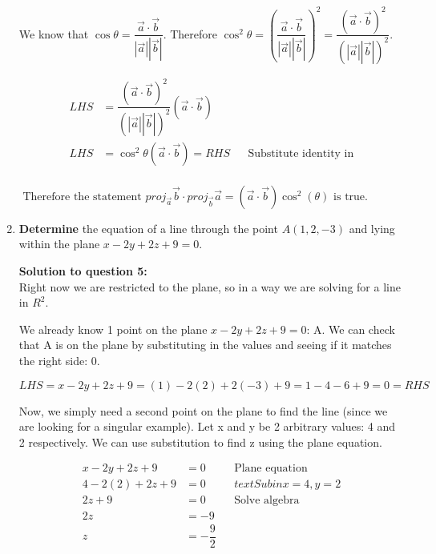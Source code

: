 \documentclass[12pt]{book}
\begin{document}
\begin{enumerate}
\vspace{-1cm}
We know that $\cos \theta = \dfrac{\vec{a} \cdot \vec{b}}{|\vec{a}||\vec{b}|}$. Therefore $\cos^2 \theta = \left(\dfrac{\vec{a} \cdot \vec{b}}{|\vec{a}||\vec{b}|} \right)^2 = \dfrac{(\vec{a} \cdot \vec{b})^2}{(|\vec{a}||\vec{b}|)^2}.$

\addtolength{\jot}{1em}
\begin{align*}
  LHS &= \dfrac{(\vec{a} \cdot \vec{b})^2}{(|\vec{a}||\vec{b}|)^2}(\vec{a} \cdot \vec{b}) \\
  LHS &= \cos^2 \theta(\vec{a} \cdot \vec{b}) = RHS && \text{Substitute identity in}\\
\end{align*}
  
\vspace{-2cm}
\begin{center}
  $\boxed{ \text{ Therefore the statement } proj_{\vec{a}}\vec{b} \cdot proj_{\vec{b}}\vec{a} = (\vec{a} \cdot \vec{b}) \cos^2(\theta) \text{ is true. }}$
\end{center}

\newpage

\item \textbf{Determine} the equation of a line through the point $A(1,2,-3)$ and lying within the plane $x-2y+2z+9=0$.

\vspace{0.3cm} 
\textbf{Solution to question 5:}\\
Right now we are restricted to the plane, so in a way we are solving for a line in $R^2$.

We already know 1 point on the plane $x-2y+2z+9=0$: A. We can check that A is on 
the plane by substituting in the values and seeing if it matches the right side: 0.

$$LHS = x-2y+2z+9 = (1)-2(2)+2(-3)+9 = 1 - 4 - 6 + 9 = 0 = RHS$$

Now, we simply need a second point on the plane to find the line (since we 
are looking for a singular example). Let x and y be 2 arbitrary values: 4 
and 2 respectively. We can use substitution to find z using the plane equation.

\addtolength{\jot}{-2em}
\begin{align*}
  x-2y+2z+9 &= 0 && \text{Plane equation}\\
  4 - 2(2) + 2z + 9 &= 0 && text{Sub in x=4, y=2}\\
  2z + 9 &= 0 && \text{Solve algebra}\\
  2z &= -9 \\
  z &= -\dfrac{9}{2} \\
\end{align*}


\end{enumerate}
\end{document}
